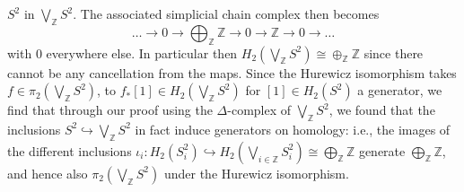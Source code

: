 \begin{solution}
        $S^2$ in $\bigvee_{\mathbb{Z}}S^2$. The
        associated simplicial chain complex then becomes
        \[
        \ldots \to 0 \to \bigoplus_{\mathbb{Z}}\mathbb{Z}
        \to 0 \to \mathbb{Z} \to 0 \to \ldots
        \] 
        with $0$ everywhere else. In particular then
        $H_2 \left( \bigvee_{\mathbb{Z}}S^2 \right) 
        \cong \oplus_{\mathbb{Z}}\mathbb{Z}$ since there
        cannot be any cancellation from the
        maps.
        Since the Hurewicz isomorphism 
        takes 
        $f \in \pi_2 \left( \bigvee_{\mathbb{Z}} S^2 \right) $,
        to $f_* \left[ 1 \right] \in 
        H_2 \left( \bigvee_{\mathbb{Z}}S^2 \right) $ 
        for $\left[ 1 \right] \in H_2\left( S^2 \right) $ 
        a generator, we find that through our proof
        using the $\Delta$-complex of $\bigvee_{\mathbb{Z}}S^2$,
        we found that the inclusions
        $S^2 \hookrightarrow \bigvee_{\mathbb{Z}}S^2$ 
        in fact induce generators on homology: i.e.,
        the images of the different inclusions
        $\iota_i \colon H_2 \left( S_i^2 \right) 
        \hookrightarrow H_2 \left( \bigvee_{i \in \mathbb{Z}}
        S_i^2 \right) 
        \cong \bigoplus_{\mathbb{Z}}\mathbb{Z}$ generate
        $\bigoplus_{\mathbb{Z}} \mathbb{Z}$, and hence
        also $\pi_2 \left( \bigvee_{\mathbb{Z}}S^2 \right) $ 
        under the Hurewicz isomorphism.\\
        \linebreak
        









\end{solution}
